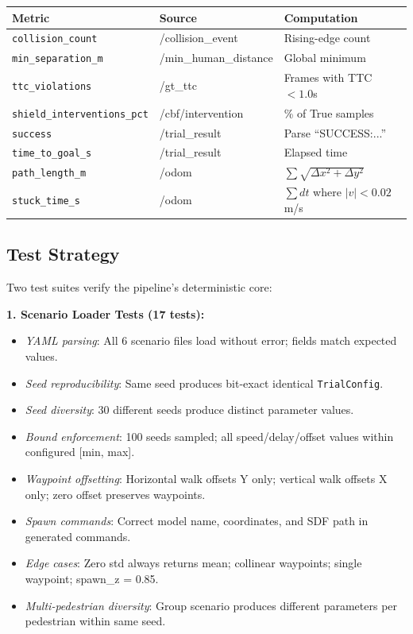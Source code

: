 \documentclass[11pt]{article}
\begin{document}
\begin{tabular}{lll}
\hline
\textbf{Metric} & \textbf{Source} & \textbf{Computation} \\
\hline
\texttt{collision\_count} & /collision\_event & Rising-edge count \\
\texttt{min\_separation\_m} & /min\_human\_distance & Global minimum \\
\texttt{ttc\_violations} & /gt\_ttc & Frames with TTC $< 1.0$s \\
\texttt{shield\_interventions\_pct} & /cbf/intervention & \% of True samples \\
\texttt{success} & /trial\_result & Parse ``SUCCESS:...'' \\
\texttt{time\_to\_goal\_s} & /trial\_result & Elapsed time \\
\texttt{path\_length\_m} & /odom & $\sum \sqrt{\Delta x^2 + \Delta y^2}$ \\
\texttt{stuck\_time\_s} & /odom & $\sum dt$ where $|v| < 0.02$ m/s \\
\hline
\end{tabular}

\subsection*{Test Strategy}

Two test suites verify the pipeline's deterministic core:

\textbf{1. Scenario Loader Tests (17 tests):}
\begin{itemize}
  \item \emph{YAML parsing}: All 6 scenario files load without error; fields match expected values.
  \item \emph{Seed reproducibility}: Same seed produces bit-exact identical \texttt{TrialConfig}.
  \item \emph{Seed diversity}: 30 different seeds produce distinct parameter values.
  \item \emph{Bound enforcement}: 100 seeds sampled; all speed/delay/offset values within configured [min, max].
  \item \emph{Waypoint offsetting}: Horizontal walk offsets Y only; vertical walk offsets X only; zero offset preserves waypoints.
  \item \emph{Spawn commands}: Correct model name, coordinates, and SDF path in generated commands.
  \item \emph{Edge cases}: Zero std always returns mean; collinear waypoints; single waypoint; spawn\_z = 0.85.
  \item \emph{Multi-pedestrian diversity}: Group scenario produces different parameters per pedestrian within same seed.
\end{itemize}
\end{document}
